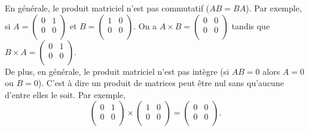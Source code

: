 \documentclass{book}
\begin{document}
\begin{Remarque}En générale, le produit matriciel n'est pas commutatif ($AB = BA$). Par exemple, si $A=\begin{pmatrix}0&1\\0&0\\\end{pmatrix}$ et $B=\begin{pmatrix}1&0\\0&0\\\end{pmatrix}$. On a $A\times B=\begin{pmatrix}0&0\\0&0\\\end{pmatrix}$ tandis que 
$B\times A = \begin{pmatrix}0&1\\0&0\\\end{pmatrix}$.\\
De plus, en générale, le produit matriciel n'est pas intègre (si $AB =0$ alors $A=0$ ou $B=0$). C'est à dire un produit de matrices peut être nul sans qu'aucune d'entre elles le soit. Par exemple, $$\begin{pmatrix}0&1\\0&0\\\end{pmatrix}\times \begin{pmatrix}1&0\\0&0\\\end{pmatrix}=\begin{pmatrix}0&0\\0&0\\\end{pmatrix}.$$
\end{Remarque}
\end{document}

